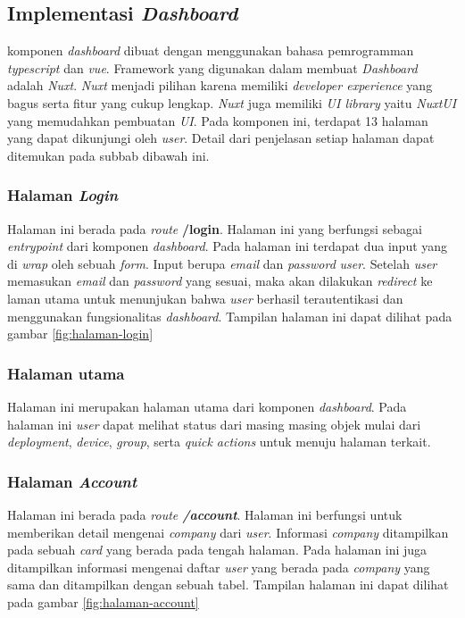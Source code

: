 \subsection{Implementasi \textit{Dashboard}}
komponen \textit{dashboard} dibuat dengan menggunakan bahasa pemrogramman \textit{typescript} dan \textit{vue}. Framework yang digunakan dalam membuat \textit{Dashboard} adalah \textit{Nuxt}. \textit{Nuxt} menjadi pilihan karena memiliki \textit{developer experience} yang bagus serta fitur yang cukup lengkap. \textit{Nuxt} juga memiliki \textit{UI library} yaitu \textit{NuxtUI} yang memudahkan pembuatan \textit{UI}. Pada komponen ini, terdapat 13 halaman yang dapat dikunjungi oleh \textit{user}. Detail dari penjelasan setiap halaman dapat ditemukan pada subbab dibawah ini.

\subsubsection{Halaman \textit{Login}}
Halaman ini berada pada \textit{route} \textbf{/login}. Halaman ini yang berfungsi sebagai \textit{entrypoint} dari komponen \textit{dashboard}. Pada halaman ini terdapat dua input yang di \textit{wrap} oleh sebuah \textit{form}. Input berupa \textit{email} dan \textit{password} \textit{user}. Setelah \textit{user} memasukan \textit{email} dan \textit{password} yang sesuai, maka akan dilakukan \textit{redirect} ke laman utama untuk menunjukan bahwa \textit{user} berhasil terautentikasi dan menggunakan fungsionalitas \textit{dashboard}. Tampilan halaman ini dapat dilihat pada gambar \ref{fig:halaman-login}

\subsubsection{Halaman utama}
Halaman ini merupakan halaman utama dari komponen \textit{dashboard}. Pada halaman ini \textit{user} dapat melihat status dari masing masing objek mulai dari \textit{deployment}, \textit{device}, \textit{group}, serta \textit{quick actions} untuk menuju halaman terkait.

\subsubsection{Halaman \textit{Account}}
Halaman ini berada pada \textit{route \textbf{/account}}. Halaman ini berfungsi untuk memberikan detail mengenai \textit{company} dari \textit{user}. Informasi \textit{company} ditampilkan pada sebuah \textit{card} yang berada pada tengah halaman. Pada halaman ini juga ditampilkan informasi mengenai daftar \textit{user} yang berada pada \textit{company} yang sama dan ditampilkan dengan sebuah tabel. Tampilan halaman ini dapat dilihat pada gambar \ref{fig:halaman-account}

